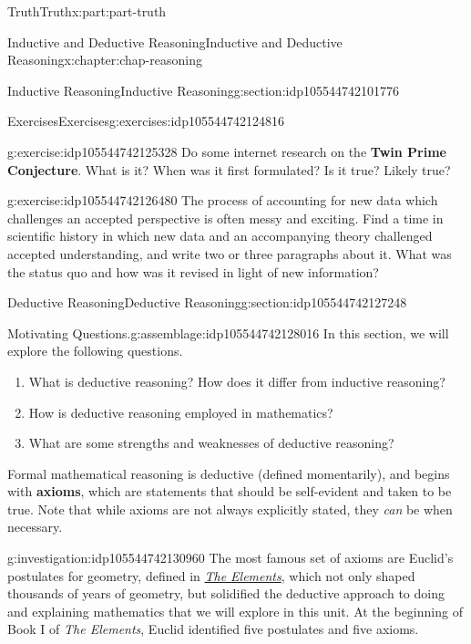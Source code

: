 \documentclass[oneside,10pt,]{book}
\newcommand{\terminology}[1]{\textbf{#1}}
\numberwithin{equation}{section}
\begin{document}
\begin{partptx}{Truth}{}{Truth}{}{}{x:part:part-truth}
\begin{chapterptx}{Inductive and Deductive Reasoning}{}{Inductive and Deductive Reasoning}{}{}{x:chapter:chap-reasoning}
\begin{sectionptx}{Inductive Reasoning}{}{Inductive Reasoning}{}{}{g:section:idp105544742101776}
\begin{exercises-subsection-numberless}{Exercises}{}{Exercises}{}{}{g:exercises:idp105544742124816}
\begin{divisionexercise}{1}{}{}{g:exercise:idp105544742125328}
Do some internet research on the \terminology{Twin Prime Conjecture}. What is it? When was it first formulated? Is it true? Likely true?%
\end{divisionexercise}%
\begin{divisionexercise}{2}{}{}{g:exercise:idp105544742126480}%
The process of accounting for new data which challenges an accepted perspective is often messy and exciting. Find a time in scientific history in which new data and an accompanying theory challenged accepted understanding, and write two or three paragraphs about it. What was the status quo and how was it revised in light of new information?%
\end{divisionexercise}%
\end{exercises-subsection-numberless}
\end{sectionptx}
%
%
\typeout{************************************************}
\typeout{************************************************}
%
\begin{sectionptx}{Deductive Reasoning}{}{Deductive Reasoning}{}{}{g:section:idp105544742127248}
\begin{assemblage}{Motivating Questions.}{g:assemblage:idp105544742128016}%
In this section, we will explore the following questions. %
\begin{enumerate}
\item{}What is deductive reasoning? How does it differ from inductive reasoning?%
\item{}How is deductive reasoning employed in mathematics?%
\item{}What are some strengths and weaknesses of deductive reasoning?%
\end{enumerate}
%
\end{assemblage}
Formal mathematical reasoning is deductive (defined momentarily), and begins with \terminology{axioms}, which are statements that should be self-evident and taken to be true. Note that while axioms are not always explicitly stated, they \emph{can} be when necessary.%
\begin{investigation}{}{g:investigation:idp105544742130960}%
The most famous set of axioms are Euclid's postulates for geometry, defined in \emph{\href{https://en.wikipedia.org/wiki/Euclid's_Elements}{The Elements}\footnotemark{}}, which not only shaped thousands of years of geometry, but solidified the deductive approach to doing and explaining mathematics that we will explore in this unit. At the beginning of Book I of \emph{The Elements}, Euclid identified five postulates and five axioms.%

\end{investigation}
\end{sectionptx}
\end{chapterptx}
\end{partptx}
\end{document}
